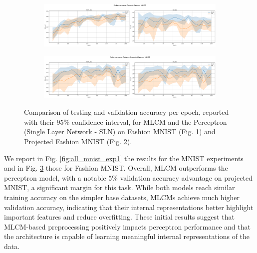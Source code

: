 \documentclass[a4paper,12pt]{report}
\begin{document}
\begin{figure}[h!]
    \centering
    \begin{subfigure}{\experimentlength\textwidth}
        \includegraphics[width=\linewidth]{pictures/fashion_mnist_exp1.png}
        \caption{}\label{fig:fashion_mnist_exp1}
    \end{subfigure}
    \hfill
    \begin{subfigure}{\experimentlength\textwidth}
        \includegraphics[width=\linewidth]{pictures/projected_fashion_mnist_exp1.png}
        \caption{}\label{fig:efashion_mnist_exp1}
    \end{subfigure}
    \caption{Comparison of testing and validation accuracy per epoch, reported with their 
    $95\%$ confidence interval, for MLCM and the Perceptron (Single Layer Network - 
    SLN) on Fashion MNIST (Fig. \ref{fig:fashion_mnist_exp1}) and Projected Fashion 
    MNIST (Fig. \ref{fig:efashion_mnist_exp1}).}
    \label{fig:all_fashion_mnist_exp1}
\end{figure}

We report in Fig. \ref{fig:all_mnist_exp1} the results for the MNIST experiments and 
in Fig. \ref{fig:all_fashion_mnist_exp1} those for Fashion MNIST. Overall, MLCM 
outperforms the perceptron model, with a notable $5\%$ validation accuracy advantage 
on projected MNIST, a significant margin for this task. While both models reach 
similar training accuracy on the simpler base datasets, MLCMs achieve much higher 
validation accuracy, indicating that their internal representations better highlight 
important features and reduce overfitting. These initial results suggest that 
MLCM-based preprocessing positively impacts perceptron performance and that the 
architecture is capable of learning meaningful internal representations of the data.
\end{document}
